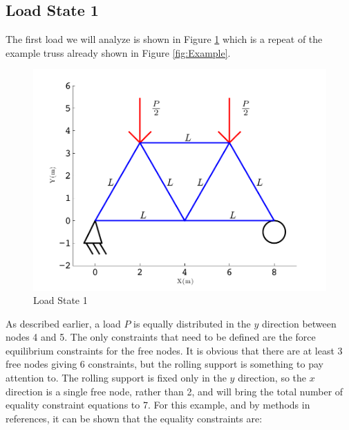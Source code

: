 \documentclass[12pt]{article}
\begin{document}
\subsection{Load State 1}
The first load we will analyze is shown in Figure \ref{fig:Load1} which is a repeat of the example truss already shown in Figure \ref{fig:Example}.
\begin{figure}[htb!]
	\begin{center}
		\includegraphics[width=1\textwidth]{TrussFS}
	\end{center}
	\caption{Load State 1}
	\label{fig:Load1}
\end{figure}
As described earlier, a load $P$ is equally distributed in the $y$ direction between nodes 4 and 5.  The only constraints that need to be defined are the force equilibrium constraints for the free nodes.  It is obvious that there are at least 3 free nodes giving 6 constraints, but the rolling support is something to pay attention to.  The rolling support is fixed only in the $y$ direction, so the $x$ direction is a single free node, rather than 2, and will bring the total number of equality constraint equations to 7.  For this example, and by methods in references, it can be shown that the equality constraints are:
\end{document}
